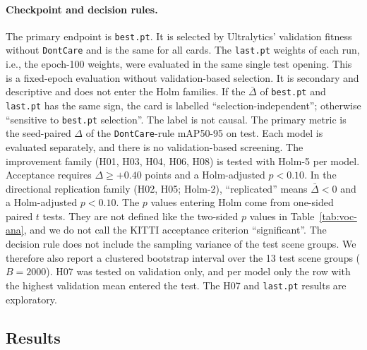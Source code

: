 \documentclass[pdflatex,iicol,sn-mathphys-num]{sn-jnl}
\begin{document}
\paragraph{Checkpoint and decision rules.}
The primary endpoint is \texttt{best.pt}. It is selected by Ultralytics' validation fitness without \texttt{DontCare} and is the same for all cards. The \texttt{last.pt} weights of each run, i.e., the epoch-100 weights, were evaluated in the same single test opening. This is a fixed-epoch evaluation without validation-based selection. It is secondary and descriptive and does not enter the Holm families. If the $\bar\Delta$ of \texttt{best.pt} and \texttt{last.pt} has the same sign, the card is labelled ``selection-independent''; otherwise ``sensitive to \texttt{best.pt} selection''. The label is not causal. The primary metric is the seed-paired $\Delta$ of the \texttt{DontCare}-rule mAP50-95 on test. Each model is evaluated separately, and there is no validation-based screening. The improvement family (H01, H03, H04, H06, H08) is tested with Holm-5 per model. Acceptance requires $\Delta\ge+0.40$ points and a Holm-adjusted $p<0.10$. In the directional replication family (H02, H05; Holm-2), ``replicated'' means $\bar\Delta<0$ and a Holm-adjusted $p<0.10$. The $p$ values entering Holm come from one-sided paired $t$ tests. They are not defined like the two-sided $p$ values in Table~\ref{tab:voc-ana}, and we do not call the KITTI acceptance criterion ``significant''. The decision rule does not include the sampling variance of the test scene groups. We therefore also report a clustered bootstrap interval over the 13 test scene groups ($B=2000$). H07 was tested on validation only, and per model only the row with the highest validation mean entered the test. The H07 and \texttt{last.pt} results are exploratory.

\subsection{Results}\label{sec:genelleme-sonuc}


\end{document}
